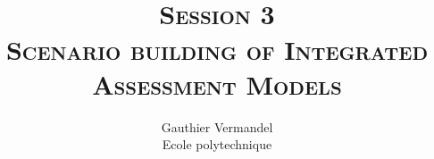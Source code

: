 \documentclass[xcolor=x11names,compress,aspectratio=169]{beamer}%
\begin{document}
%

\title[\SHORTNAME]{
\textsc{\footnotesize\SHORTNAME\\ Session 3\\[0.35em] \Large
Scenario building of Integrated Assessment Models}
\\
}
\author{ Gauthier Vermandel\\
{\footnotesize Ecole polytechnique}}
\date{}%
%

\begin{frame}%
%

\maketitle
%

\transboxout
\end{frame}%
%
\end{document}
